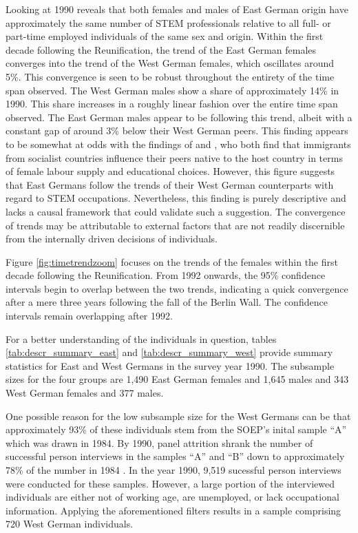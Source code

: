 \documentclass[a4paper, oneside, hyperfootnotes = false]{article}
\begin{document}
{Looking at 1990 reveals that both females and males of East German origin have approximately the same number of STEM professionals relative to all full- or part-time employed individuals of the same sex and origin.
Within the first decade following the Reunification, the trend of the East German females converges into the trend of the West German females, which oscillates around 5\%.
This convergence is seen to be robust throughout the entirety of the time span observed.
The West German males show a share of approximately 14\% in 1990.
This share increases in a roughly linear fashion over the entire time span observed.
The East German males appear to be following this trend, albeit with a constant gap of around 3\% below their West German peers.
This finding appears to be somewhat at odds with the findings of \cite{Jessen2023} and \cite{FriedmanSokuler2020}, who both find that immigrants from socialist countries influence their peers native to the host country in terms of female labour supply and educational choices.
However, this figure suggests that East Germans follow the trends of their West German counterparts with regard to STEM occupations.
Nevertheless, this finding is purely descriptive and lacks a causal framework that could validate such a suggestion.
The convergence of trends may be attributable to external factors that are not readily discernible from the internally driven decisions of individuals.

Figure \ref{fig:timetrendzoom} focuses on the trends of the females within the first decade following the Reunification.
From 1992 onwards, the 95\% confidence intervals begin to overlap between the two trends, indicating a quick convergence after a mere three years following the fall of the Berlin Wall.
The confidence intervals remain overlapping after 1992.

For a better understanding of the individuals in question, tables \ref{tab:descr_summary_east} and \ref{tab:descr_summary_west} provide summary statistics for East and West Germans in the survey year 1990.
The subsample sizes for the four groups are 1,490 East German females and 1,645 males and 343 West German females and 377 males.

One possible reason for the low subsample size for the West Germans can be that approximately 93\% of these individuals stem from the SOEP's inital sample ``A'' which was drawn in 1984.
By 1990, panel attrition shrank the number of successful person interviews in the samples ``A'' and ``B'' down to approximately 78\% of the number in 1984 \citep{Siegers2022}.
In the year 1990, 9,519 sucessful person interviews were conducted for these samples.
However, a large portion of the interviewed individuals are either not of working age, are unemployed, or lack occupational information.
Applying the aforementioned filters results in a sample comprising 720 West German individuals.

}
\end{document}
